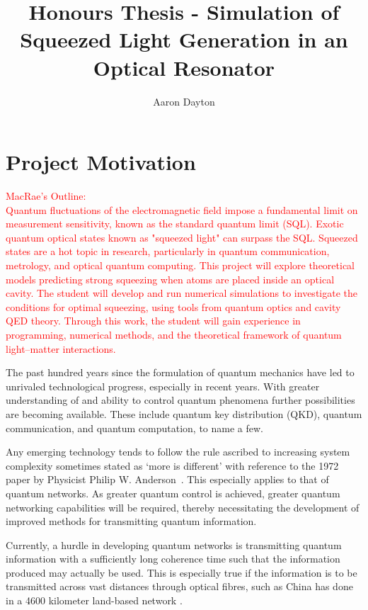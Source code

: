 \documentclass[aps,pra,twocolumn,showpacs,amsmath,amssymb,nofootinbib,longbibliography,superscriptaddress
]{revtex4-1}
\theoremstyle{definition}
\theoremstyle{remark}
\newcommand{\0}{\hat{0}}
\begin{document}
\title{Honours Thesis - Simulation of Squeezed Light Generation in an Optical Resonator}
\author{Aaron Dayton}

\maketitle
\tableofcontents


\section{Project Motivation}

\textcolor{red}{
    MacRae's Outline:\\
    Quantum fluctuations of the electromagnetic field impose a fundamental limit on measurement sensitivity, known as the standard quantum limit (SQL). Exotic quantum optical states known as "squeezed light" can surpass the SQL. Squeezed states are a hot topic in research, particularly in quantum communication, metrology, and optical quantum computing. This project will explore theoretical models predicting strong squeezing when atoms are placed inside an optical cavity. The student will develop and run numerical simulations to investigate the conditions for optimal squeezing, using tools from quantum optics and cavity QED theory. Through this work, the student will gain experience in programming, numerical methods, and the theoretical framework of quantum light–matter interactions.
}

The past hundred years since the formulation of quantum mechanics have led to unrivaled technological progress, especially in recent years. With greater understanding of and ability to control quantum phenomena further possibilities are becoming available. These include quantum key distribution (QKD), quantum communication, and quantum computation, to name a few.

Any emerging technology tends to follow the rule ascribed to increasing system complexity sometimes stated as `more is different' with reference to the 1972 paper by Physicist Philip W. Anderson~\cite{Philip}. This especially applies to that of quantum networks. As greater quantum control is achieved, greater quantum networking capabilities will be required, thereby necessitating the development of improved methods for transmitting quantum information.

Currently, a hurdle in developing quantum networks is transmitting quantum information with a sufficiently long coherence time such that the information produced may actually be used. This is especially true if the information is to be transmitted across vast distances through optical fibres, such as China has done in a 4600 kilometer land-based network \cite{Chen}.
\end{document}
